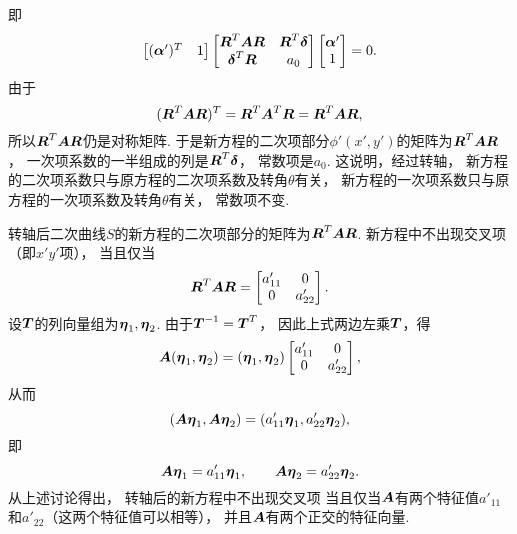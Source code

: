 即\begin{equation*}
	\begin{bmatrix}
		(\boldsymbol\alpha')^T & 1
	\end{bmatrix}
	\begin{bmatrix}
		\boldsymbol{R}^T \boldsymbol{A} \boldsymbol{R} & \boldsymbol{R}^T \boldsymbol\delta \\
		\boldsymbol\delta^T \boldsymbol{R} & a_0
	\end{bmatrix}
	\begin{bmatrix}
		\boldsymbol\alpha' \\ 1
	\end{bmatrix}
	= 0.
\end{equation*}
由于\begin{equation*}
	(\boldsymbol{R}^T \boldsymbol{A} \boldsymbol{R})^T
	= \boldsymbol{R}^T \boldsymbol{A}^T \boldsymbol{R}
	= \boldsymbol{R}^T \boldsymbol{A} \boldsymbol{R},
\end{equation*}
所以\(\boldsymbol{R}^T \boldsymbol{A} \boldsymbol{R}\)仍是对称矩阵.
于是新方程的二次项部分\(\phi'(x',y')\)的矩阵为\(\boldsymbol{R}^T \boldsymbol{A} \boldsymbol{R}\)，
一次项系数的一半组成的列是\(\boldsymbol{R}^T \boldsymbol\delta\)，
常数项是\(a_0\).
这说明，经过转轴，
新方程的二次项系数只与原方程的二次项系数及转角\(\theta\)有关，
新方程的一次项系数只与原方程的一次项系数及转角\(\theta\)有关，
常数项不变.

转轴后二次曲线\(S\)的新方程的二次项部分的矩阵为\(\boldsymbol{R}^T \boldsymbol{A} \boldsymbol{R}\).
新方程中不出现交叉项（即\(x' y'\)项），
当且仅当\begin{equation*}
	\boldsymbol{R}^T \boldsymbol{A} \boldsymbol{R}
	= \begin{bmatrix}
		a'_{11} & 0 \\
		0 & a'_{22}
	\end{bmatrix}.
\end{equation*}
设\(\boldsymbol{T}\)的列向量组为\(\boldsymbol\eta_1,\boldsymbol\eta_2\).
由于\(\boldsymbol{T}^{-1} = \boldsymbol{T}^T\)，
因此上式两边左乘\(\boldsymbol{T}\)，得\begin{equation*}
	\boldsymbol{A} (\boldsymbol\eta_1,\boldsymbol\eta_2)
	= (\boldsymbol\eta_1,\boldsymbol\eta_2)
	\begin{bmatrix}
		a'_{11} & 0 \\
		0 & a'_{22}
	\end{bmatrix},
\end{equation*}
从而\begin{equation*}
	(\boldsymbol{A} \boldsymbol\eta_1,\boldsymbol{A} \boldsymbol\eta_2)
	= (a'_{11} \boldsymbol\eta_1,a'_{22} \boldsymbol\eta_2),
\end{equation*}
即\begin{equation*}
	\boldsymbol{A} \boldsymbol\eta_1
	= a'_{11} \boldsymbol\eta_1,
	\qquad
	\boldsymbol{A} \boldsymbol\eta_2
	= a'_{22} \boldsymbol\eta_2.
\end{equation*}
从上述讨论得出，
转轴后的新方程中不出现交叉项
当且仅当\(\boldsymbol{A}\)有两个特征值\(a'_{11}\)和\(a'_{22}\)（这两个特征值可以相等），
并且\(\boldsymbol{A}\)有两个正交的特征向量.
